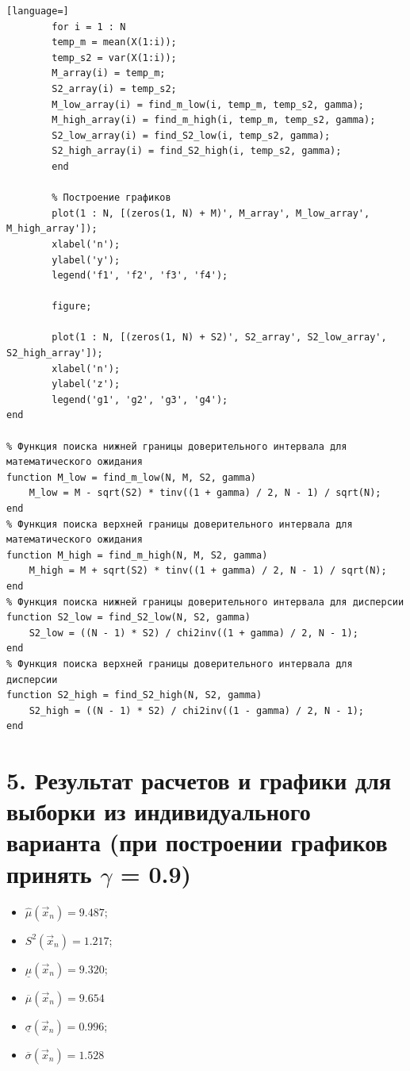 \documentclass[12pt]{report}
\begin{document}
\begin{lstlisting}[language=]
		for i = 1 : N
		temp_m = mean(X(1:i));
		temp_s2 = var(X(1:i));
		M_array(i) = temp_m;
		S2_array(i) = temp_s2;
		M_low_array(i) = find_m_low(i, temp_m, temp_s2, gamma);
		M_high_array(i) = find_m_high(i, temp_m, temp_s2, gamma);
		S2_low_array(i) = find_S2_low(i, temp_s2, gamma);
		S2_high_array(i) = find_S2_high(i, temp_s2, gamma);
		end
		
		% Построение графиков
		plot(1 : N, [(zeros(1, N) + M)', M_array', M_low_array', M_high_array']);
		xlabel('n');
		ylabel('y');
		legend('f1', 'f2', 'f3', 'f4');
		
		figure;
		
		plot(1 : N, [(zeros(1, N) + S2)', S2_array', S2_low_array', S2_high_array']);
		xlabel('n');
		ylabel('z');
		legend('g1', 'g2', 'g3', 'g4');
end
	
% Функция поиска нижней границы доверительного интервала для математического ожидания
function M_low = find_m_low(N, M, S2, gamma)
	M_low = M - sqrt(S2) * tinv((1 + gamma) / 2, N - 1) / sqrt(N);
end
% Функция поиска верхней границы доверительного интервала для математического ожидания
function M_high = find_m_high(N, M, S2, gamma)
	M_high = M + sqrt(S2) * tinv((1 + gamma) / 2, N - 1) / sqrt(N);
end
% Функция поиска нижней границы доверительного интервала для дисперсии
function S2_low = find_S2_low(N, S2, gamma)
	S2_low = ((N - 1) * S2) / chi2inv((1 + gamma) / 2, N - 1);
end
% Функция поиска верхней границы доверительного интервала для дисперсии
function S2_high = find_S2_high(N, S2, gamma)
	S2_high = ((N - 1) * S2) / chi2inv((1 - gamma) / 2, N - 1);
end
\end{lstlisting}

\section*{5. Результат расчетов и графики для выборки из индивидуального варианта (при построении графиков принять $\gamma$ = 0.9)}

\begin{itemize}
	\item $\hat \mu (\vec x_n) = 9.487$;
	\item $ S^2 (\vec x_n) = 1.217$;
	\item $\underline \mu (\vec x_n) = 9.320$;
	\item $\overline\mu (\vec x_n) = 9.654$
	\item $\underline \sigma (\vec x_n) = 0.996$;
	\item $\overline \sigma (\vec x_n) = 1.528$
\end{itemize}
\end{document}
